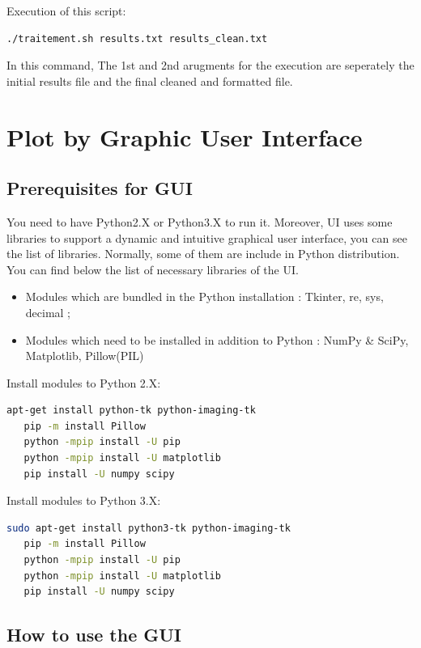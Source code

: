 \documentclass[a4paper, 10 pt]{report}
\begin{document}
	Execution of this script:
	
	\begin{lstlisting}[language=bash,frame=single]
   ./traitement.sh results.txt results_clean.txt
	\end{lstlisting}
	
	In this command, The 1st and 2nd arugments for the execution are seperately the initial results file and the final cleaned and formatted file.
	
	\section{Plot by Graphic User Interface}

	\subsection{Prerequisites for GUI}
	
	You need to have Python2.X or Python3.X to run it. Moreover, UI uses some libraries to support a dynamic and intuitive graphical user interface, you can see the list of libraries. Normally, some of them are include in Python distribution. You can find below the list of necessary libraries of the UI.
	
	\begin{itemize}
		\item Modules which are bundled in the Python installation : Tkinter, re, sys, decimal ;
		\item Modules which need to be installed in addition to Python : NumPy \& SciPy, Matplotlib, Pillow(PIL)
	\end{itemize}

	Install modules to Python 2.X:
	\begin{lstlisting}[language=bash,frame=single]
   apt-get install python-tk python-imaging-tk
   pip -m install Pillow
   python -mpip install -U pip
   python -mpip install -U matplotlib
   pip install -U numpy scipy
	\end{lstlisting}

	Install modules to Python 3.X:
	\begin{lstlisting}[language=bash,frame=single]
   sudo apt-get install python3-tk python-imaging-tk
   pip -m install Pillow
   python -mpip install -U pip
   python -mpip install -U matplotlib
   pip install -U numpy scipy
	\end{lstlisting}

	\subsection{How to use the GUI}
	
\end{document}
